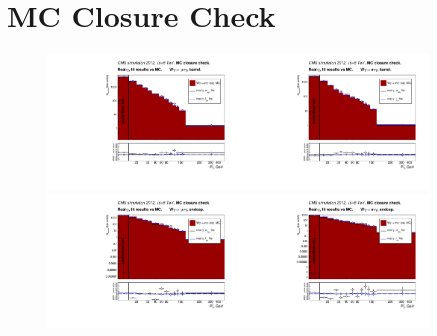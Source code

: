 \chapter{MC Closure Check}
\label{sec:MCclosureCheck}


 \begin{figure}[htb]
  \begin{center}
   \includegraphics[width=0.45\textwidth]{../figs/figs_v11/MUON_WGamma/MCclosureWjetsPlusWg/c_TrueDDvsMC_c_MUON_WGamma__UNblind_MCclosure__Barrel__phoEt_MCclosure.pdf}\includegraphics[width=0.45\textwidth]{../figs/figs_v11/ELECTRON_WGamma/MCclosureWjetsPlusWg/c_TrueDDvsMC_c_ELECTRON_WGamma__UNblind_MCclosure__Barrel__phoEt_MCclosure.pdf}
   \includegraphics[width=0.45\textwidth]{../figs/figs_v11/MUON_WGamma/MCclosureWjetsPlusWg/c_TrueDDvsMC_c_MUON_WGamma__UNblind_MCclosure__Endcap__phoEt_MCclosure.pdf}\includegraphics[width=0.45\textwidth]{../figs/figs_v11/ELECTRON_WGamma/MCclosureWjetsPlusWg/c_TrueDDvsMC_c_ELECTRON_WGamma__UNblind_MCclosure__Endcap__phoEt_MCclosure.pdf}

\end{center}
\end{figure}
